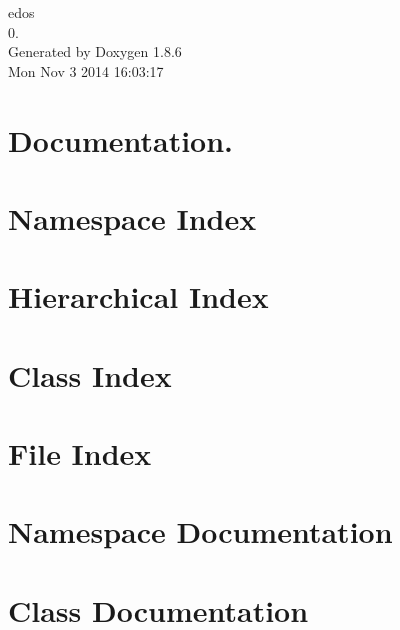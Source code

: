 \documentclass[twoside]{book}
\newcommand{\clearemptydoublepage}{%
  \newpage{\pagestyle{empty}\cleardoublepage}%
}
\begin{document}
\hypersetup{pageanchor=false}
\begin{titlepage}
\vspace*{7cm}
\begin{center}%
{\Large edos \\[1ex]\large 0. }\\
\vspace*{1cm}
{\large Generated by Doxygen 1.8.6}\\
\vspace*{0.5cm}
{\small Mon Nov 3 2014 16:03:17}\\
\end{center}
\end{titlepage}
\clearemptydoublepage
\tableofcontents
\clearemptydoublepage
{}
\hypersetup{pageanchor=true}

\chapter{Documentation.}
\label{index}\hypertarget{index}{}
\chapter{Namespace Index}

\chapter{Hierarchical Index}

\chapter{Class Index}

\chapter{File Index}

\chapter{Namespace Documentation}

\chapter{Class Documentation}
















\end{document}
